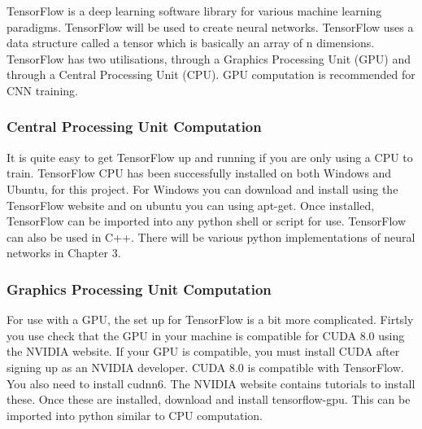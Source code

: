 TensorFlow is a deep learning software library for various machine learning paradigms. TensorFlow will be used to create neural networks.
TensorFlow uses a data structure called a tensor which is basically an array of n dimensions.
TensorFlow has two utilisations, through a Graphics Processing Unit (GPU) and through a Central Processing Unit (CPU).
GPU computation is recommended for CNN training. 

\tocless\subsubsection{Central Processing Unit Computation}
It is quite easy to get TensorFlow up and running if you are only using a CPU to
train. TensorFlow CPU has been successfully installed on both Windows and Ubuntu, for this project.
For Windows you can download and install using the TensorFlow website and on ubuntu you can
using apt-get. Once installed, TensorFlow can be imported into any python shell
or script for use. TensorFlow can also be used in C++. There will be various
python implementations of neural networks in Chapter 3.

\tocless\subsubsection{Graphics Processing Unit Computation}
For use with a GPU, the set up for TensorFlow is a bit more complicated. Firtsly
you use check that the GPU in your machine is compatible for CUDA 8.0 using the
NVIDIA website. If your GPU is compatible, you must install CUDA after signing
up as an NVIDIA developer. CUDA 8.0 is compatible with TensorFlow. You also need
to install cudnn6. The NVIDIA website contains tutorials to install these. Once
these are installed, download and install tensorflow-gpu. This can be imported into
python similar to CPU computation.
